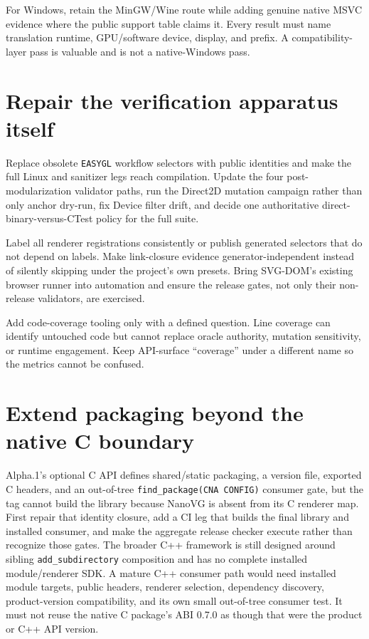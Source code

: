 For Windows, retain the MinGW/Wine route while adding genuine native MSVC evidence where the public
support table claims it.  Every result must name translation runtime, GPU/software device, display,
and prefix.  A compatibility-layer pass is valuable and is not a native-Windows pass.

\section{Repair the verification apparatus itself}

Replace obsolete \texttt{EASYGL} workflow selectors with public identities and make the full Linux
and sanitizer legs reach compilation.  Update the four post-modularization validator paths, run the
Direct2D mutation campaign rather than only anchor dry-run, fix Device filter drift, and decide one
authoritative direct-binary-versus-CTest policy for the full suite.

Label all renderer registrations consistently or publish generated selectors that do not depend on
labels.  Make link-closure evidence generator-independent instead of silently skipping under the
project's own presets.  Bring SVG-DOM's existing browser runner into automation and ensure the
release gates, not only their non-release validators, are exercised.

Add code-coverage tooling only with a defined question.  Line coverage can identify untouched code
but cannot replace oracle authority, mutation sensitivity, or runtime engagement.  Keep API-surface
``coverage'' under a different name so the metrics cannot be confused.

\section{Extend packaging beyond the native C boundary}

Alpha.1's optional C API defines shared/static packaging, a version file, exported C headers, and
an out-of-tree \texttt{find\_package(CNA CONFIG)} consumer gate, but the tag cannot build the
library because NanoVG is absent from its C renderer map. First repair that identity closure, add
a CI leg that builds the final library and installed consumer, and make the aggregate release
checker execute rather than recognize those gates. The broader C++ framework is still designed
around sibling \texttt{add\_subdirectory} composition and has no complete installed module/renderer
SDK. A mature C++ consumer path would need installed module targets, public headers, renderer
selection, dependency discovery, product-version compatibility, and its own small out-of-tree
consumer test. It must not reuse the native C package's ABI 0.7.0 as though that were the product
or C++ API version.

